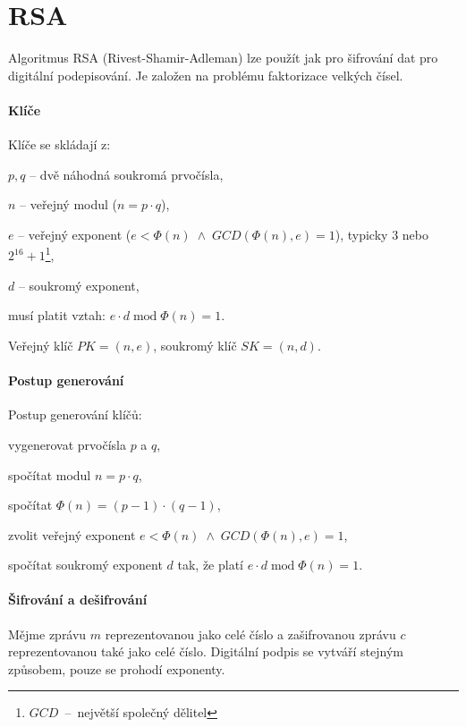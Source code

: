 
\section{RSA}

Algoritmus RSA (Rivest-Shamir-Adleman) lze použít jak pro šifrování dat pro digitální podepisování. Je založen na problému faktorizace velkých čísel.

\paragraph*{Klíče} Klíče se skládají z: \begin{compactitem}
    \item $p, q$ -- dvě náhodná soukromá prvočísla,
    \item $n$ -- veřejný modul ($n = p \cdot q$),
    \item $e$ -- veřejný exponent ($e < \Phi(n) \; \land \; GCD(\Phi(n), e) = 1$), typicky $3$ nebo $2^{16}+1$\footnote{$GCD$~--~největší společný dělitel},
    \item $d$ -- soukromý exponent,
    \item musí platit vztah: $e \cdot d \; \text{mod} \; \Phi(n) = 1$.
\end{compactitem}

\noindent Veřejný klíč $PK = (n, e)$, soukromý klíč $SK = (n, d)$.

\paragraph*{Postup generování} Postup generování klíčů: \begin{compactenum}
    \item vygenerovat prvočísla $p$ a $q$,
    \item spočítat modul $n = p \cdot q$,
    \item spočítat $\Phi(n) = (p-1) \cdot (q-1)$,
    \item zvolit veřejný exponent $e < \Phi(n) \; \land \;GCD(\Phi(n), e) = 1$,
    \item spočítat soukromý exponent $d$ tak, že platí $e \cdot d \; \text{mod} \; \Phi(n) = 1$.
\end{compactenum}

\paragraph*{Šifrování a dešifrování} Mějme zprávu $m$ reprezentovanou jako celé číslo a zašifrovanou zprávu $c$ reprezentovanou také jako celé číslo. Digitální podpis se vytváří stejným způsobem, pouze se prohodí exponenty.

